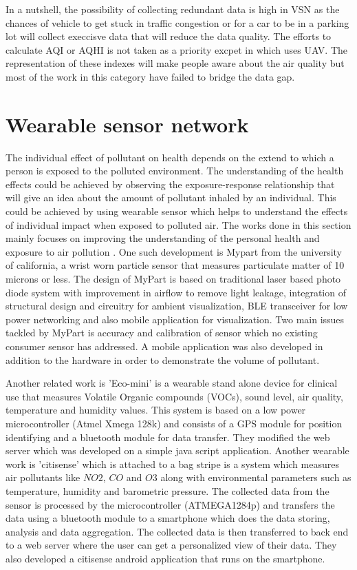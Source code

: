 In a nutshell, the possibility of collecting redundant data is high in VSN as the chances of vehicle to get stuck in traffic congestion or for a car to be in a parking lot will collect execcisve data that will reduce the data quality. The efforts to calculate AQI or AQHI is not taken as a priority excpet in \cite{Zhi2017} which uses UAV. The representation of  these indexes will make people aware about the air quality but most of the work in this category have failed to bridge the data gap.


\section{Wearable sensor network}


The individual effect of pollutant on health depends on the extend to which a person is exposed to the polluted environment. The understanding of the health effects could be achieved by observing the exposure-response relationship \cite{Dons2017} that will give an idea about the amount of pollutant inhaled by an individual. This could be achieved by using wearable sensor which helps to understand the effects of individual impact when exposed to polluted air. The works done in this section mainly focuses on improving the understanding of the personal health and exposure to air pollution \cite{Hu2015}. One such development is Mypart \cite{Tian2016}  from the university of california, a wrist worn particle sensor that measures particulate matter of 10 microns or less.  The design of MyPart is based on traditional laser based photo diode system with improvement in airflow to remove light leakage, integration of structural design and circuitry for ambient visualization, BLE transceiver for low power networking and also mobile application for visualization. Two main issues tackled by MyPart is accuracy and calibration of sensor which no existing consumer sensor has addressed. A mobile application was also developed in addition to the hardware in order to demonstrate the volume of pollutant.

Another related work is 'Eco-mini'\cite{Fletcher2015} is a wearable stand alone device for clinical use that measures Volatile Organic compounds (VOCs), sound level, air quality, temperature and humidity values. This system is based on a low power microcontroller (Atmel Xmega 128k) and consists of a GPS module for position identifying and a bluetooth module for data transfer. They modified the web server which was developed on a simple java script application. Another wearable work is 'citisense' \cite{Zappi2012} which is attached to a bag stripe is a system which measures air pollutants like $NO2$, $CO$ and  $O3$ along with environmental parameters such as temperature, humidity and barometric pressure. The collected data from the sensor is processed by the microcontroller (ATMEGA1284p) and transfers the data using a bluetooth module to a smartphone which does the data storing, analysis and data aggregation. The collected data is then transferred to back end to a web server where the user can get a personalized view of their data. They also developed a citisense android application that runs on the smartphone.
 
